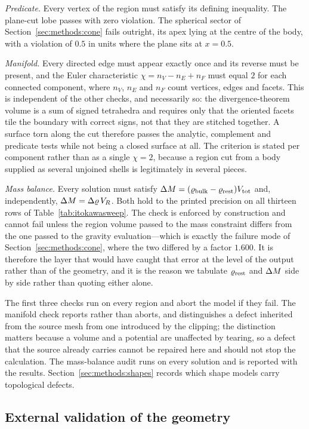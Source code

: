 \emph{Predicate.} Every vertex of the region must satisfy its defining
inequality. The plane-cut lobe passes with zero violation. The spherical
sector of Section~\ref{sec:methods:cone} fails outright, its apex lying
at the centre of the body, with a violation of $0.5$ in units where the
plane sits at $x=0.5$.

\emph{Manifold.} Every directed edge must appear exactly once and its
reverse must be present, and the Euler characteristic
$\chi = n_V - n_E + n_F$ must equal $2$ for each connected component,
where $n_V$, $n_E$ and $n_F$ count vertices, edges and facets. This is
independent of the other checks, and necessarily so: the
divergence-theorem volume is a sum of signed tetrahedra and requires only
that the oriented facets tile the boundary with correct signs, not that
they are stitched together. A surface torn along the cut therefore passes
the analytic, complement and predicate tests while not being a closed
surface at all. The criterion is stated per component rather than as a
single $\chi = 2$, because a region cut from a body supplied as several
unjoined shells is legitimately in several pieces.

\emph{Mass balance.} Every solution must satisfy
$\Delta M = (\varrho_{\mathrm{bulk}} - \varrho_{\mathrm{rest}})V_{\mathrm{tot}}$ and, independently,
$\Delta M = \Delta\varrho\,V_{R}$. Both hold to the printed precision on all
thirteen rows of Table~\ref{tab:itokawasweep}. The check is enforced by
construction and cannot fail unless the region volume passed to the mass
constraint differs from the one passed to the gravity evaluation---which
is exactly the failure mode of Section~\ref{sec:methods:cone}, where the
two differed by a factor $1.600$. It is therefore the layer that would
have caught that error at the level of the output rather than of the
geometry, and it is the reason we tabulate $\varrho_{\mathrm{rest}}$ and $\Delta M$ side
by side rather than quoting either alone.

The first three checks run on every region and abort the model if they
fail. The manifold check reports rather than aborts, and distinguishes a
defect inherited from the source mesh from one introduced by the
clipping; the distinction matters because a volume and a potential are
unaffected by tearing, so a defect that the source already carries cannot
be repaired here and should not stop the calculation. The mass-balance
audit runs on every solution and is reported with the results.
Section~\ref{sec:methods:shapes} records which shape models carry
topological defects.

\subsection{External validation of the geometry}
\label{sec:methods:external}

